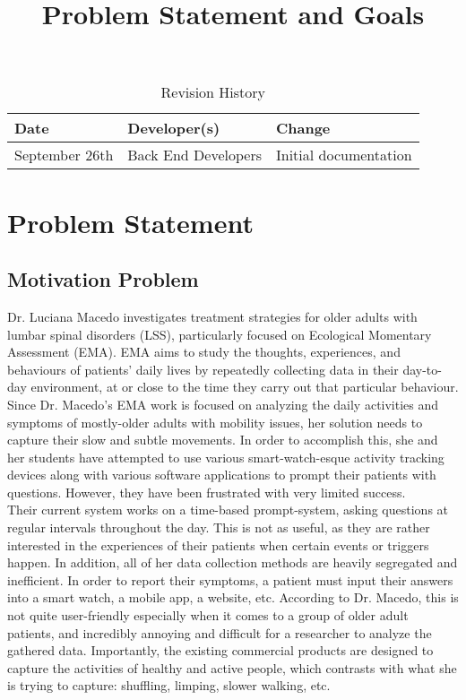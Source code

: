 \documentclass[12pt]{article}
\title{Problem Statement and Goals\\\progname}
\author{\authname}
\date{}
\begin{document}
\maketitle

\begin{table}[hp]
    \caption{Revision History} \label{TblRevisionHistory}
    \begin{tabularx}{\textwidth}{llX}
        \toprule
        \textbf{Date}  & \textbf{Developer(s)} & \textbf{Change}       \\
        \midrule
        September 26th &    Back End Developers   & Initial documentation \\
        \bottomrule
    \end{tabularx}
\end{table}

\newpage

\section{Problem Statement}

\subsection{Motivation Problem}

Dr. Luciana Macedo investigates treatment strategies for older adults with  lumbar spinal disorders (LSS), particularly focused on Ecological Momentary Assessment (EMA). EMA aims to study the thoughts, experiences, and behaviours of patients' daily lives by repeatedly collecting data in their day-to-day environment, at or close to the time they carry out that particular behaviour.\\

Since Dr. Macedo's EMA work is focused on analyzing the daily activities and symptoms of mostly-older adults with mobility issues, her solution needs to capture their slow and subtle movements. In order to accomplish this, she and her students have attempted to use various smart-watch-esque activity tracking devices along with various software applications to prompt their patients with questions. However, they have been frustrated with very limited success.\\

Their current system works on a time-based prompt-system, asking questions at regular intervals throughout the day. This is not as useful, as they are rather interested in the experiences of their patients when certain events or triggers happen. In addition, all of her data collection methods are heavily segregated and inefficient. In order to report their symptoms, a patient must input their answers into a smart watch, a mobile app, a website, etc. According to Dr. Macedo, this is not quite user-friendly especially when it comes to a group of older adult patients, and incredibly annoying and difficult for a researcher to analyze the gathered data. Importantly, the existing commercial products are designed to capture the activities of healthy and active people, which contrasts with what she is trying to capture: shuffling, limping, slower walking, etc.\\
\end{document}
